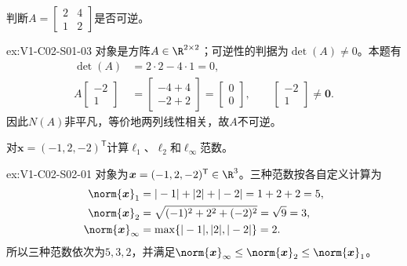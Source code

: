 \begin{SLChapterExercisePairSection}
\begin{exercise}[行列式与可逆性]\label{ex:V1-C02-S01-03}
判断$A=\begin{bmatrix}2&4\\1&2\end{bmatrix}$是否可逆。
\end{exercise}
\label{sol:V1-C02-S01-03}
\begin{chapterexercisesolution}{ex:V1-C02-S01-03}
对象是方阵$A\in\R^{2\times2}$；可逆性的判据为$\det(A)\ne0$。本题有
\[
\begin{aligned}
\det(A)&=2\cdot2-4\cdot1=0,\\
A\begin{bmatrix}-2\\1\end{bmatrix}
&=\begin{bmatrix}-4+4\\-2+2\end{bmatrix}
=\begin{bmatrix}0\\0\end{bmatrix},
\qquad \begin{bmatrix}-2\\1\end{bmatrix}\ne\boldsymbol0.
\end{aligned}
\]
因此$N(A)$非平凡，等价地两列线性相关，故$A$不可逆。
\end{chapterexercisesolution}

\begin{exercise}[三种范数]\label{ex:V1-C02-S02-01}
对$\boldsymbol{x}=(-1,2,-2)^{\mathsf T}$计算$\ell_1$、$\ell_2$和$\ell_{\infty}$范数。
\end{exercise}
\label{sol:V1-C02-S02-01}
\begin{chapterexercisesolution}{ex:V1-C02-S02-01}
对象为$\boldsymbol{x}=(-1,2,-2)^{\mathsf T}\in\R^3$。三种范数按各自定义计算为
\[
\begin{aligned}
\norm{\boldsymbol{x}}_1
&=|-1|+|2|+|-2|=1+2+2=5,\\
\norm{\boldsymbol{x}}_2
&=\sqrt{(-1)^2+2^2+(-2)^2}=\sqrt9=3,\\
\norm{\boldsymbol{x}}_\infty
&=\max\{|-1|,|2|,|-2|\}=2.
\end{aligned}
\]
所以三种范数依次为$5,3,2$，并满足$\norm{\boldsymbol x}_\infty\le\norm{\boldsymbol x}_2\le\norm{\boldsymbol x}_1$。
\end{chapterexercisesolution}


\end{SLChapterExercisePairSection}
